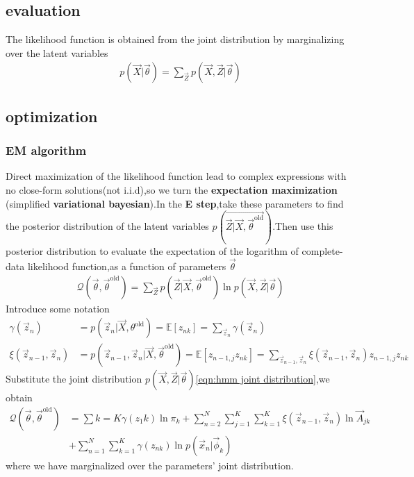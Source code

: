\subsection{evaluation}
The likelihood function is obtained from the joint distribution by marginalizing over the latent variables
\begin{align}
p(\vec{X}|\vec{\theta})=\sum_{\vec{Z}}{p(\vec{X},\vec{Z}|\vec{\theta})}
\end{align}

\subsection{optimization}
\subsubsection{EM algorithm}
Direct maximization of the likelihood function lead to complex expressions with no close-form solutions(not i.i.d),so we turn the \textbf{expectation maximization} (simplified \textbf{variational bayesian}).In the \textbf{E step},take these parameters to find the posterior distribution of the latent variables $p(\vec{\vec{Z}|\vec{X},\vec{\theta}^{\text{old}}})$.Then use this posterior distribution to evaluate the expectation of the logarithm of complete-data likelihood function,as a function of parameters $\vec{\theta}$
\begin{align}
\mathcal{Q}(\vec{\theta},\vec{\theta}^{\text{old}}) =\sum_{\vec{Z}}{p(\vec{Z}|\vec{X},\vec{\theta}^{\text{old}})}\ln p(\vec{X},\vec{Z}|\vec{\theta})
\end{align}
Introduce some notation
\begin{align}
\gamma(\vec{z}_n) &= p(\vec{z}_n|\vec{X},\theta^{\text{old}}) 
=\mathbb{E}[z_{nk}]=\sum_{\vec{z}_n}{\gamma(\vec{z}_n)} \\
\xi(\vec{z}_{n-1},\vec{z}_n)&=p(\vec{z}_{n-1},\vec{z}_n|\vec{X},\vec{\theta}^{\text{old}})
=\mathbb{E}[{z_{n-1,j}z_{nk}}]=
\sum_{\vec{z}_{n-1},\vec{z}_n}\xi(\vec{z}_{n-1},\vec{z}_n)z_{n-1,j}z_{nk}
\end{align}
Substitute the joint distribution $p(\vec{X},\vec{Z}|\vec{\theta})$\ref{eqn:hmm joint distribution},we obtain
\begin{align}
\mathcal{Q}(\vec{\theta},\vec{\theta}^{\text{old}}) 
&= \sum{k=K}\gamma(z_1 k)\ln\pi_k+\sum_{n=2}^{N}\sum_{j=1}^{K}\sum_{k=1}^{K}\xi(\vec{z}_{n-1},\vec{z}_n)\ln\vec{A}_{jk}\\
&+ \sum_{n=1}^{N}\sum_{k=1}^{K}\gamma(z_{nk})\ln p(\vec{x}_n|\vec{\phi}_k)
\end{align}
where we have marginalized over the parameters' joint distribution.

